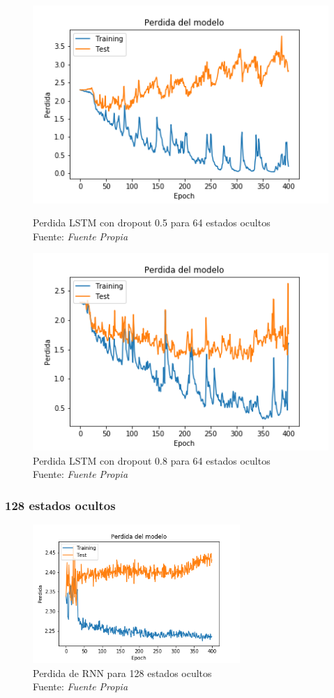 \begin{figure}[H]
	\centering
	\includegraphics[width=0.7\linewidth]{Figures/lstm_64_05_cost}
	\caption{Perdida LSTM con dropout 0.5 para 64 estados ocultos\\ Fuente: {\textit{Fuente Propia}}}
	\label{fig:lstm6405cost}
	\centering
	\includegraphics[width=0.7\linewidth]{Figures/lstm_64_08_cost}
	\caption{Perdida LSTM con dropout 0.8 para 64 estados ocultos\\ Fuente: {\textit{Fuente Propia}}}
	\label{fig:lstm6408cost}
\end{figure}


\subsubsection{128 estados ocultos}\label{128statecost}
\begin{figure}[H]
	\centering
	\includegraphics[width=0.7\textwidth]{Figures/rnn_cost_400_13mfcc}
	\caption{Perdida de RNN para 128 estados ocultos\\ Fuente: {\textit{Fuente Propia}}}
	\label{RNNSIMPLEcost}
\end{figure} 


